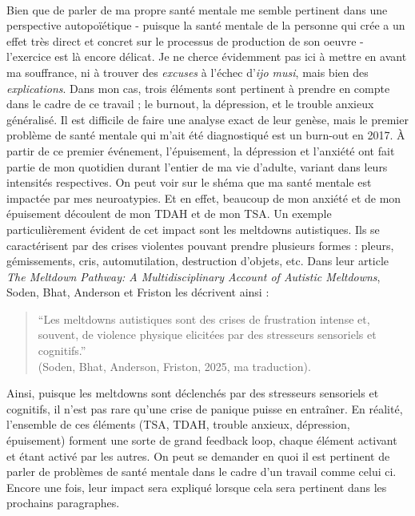 \documentclass{scrartcl}
\let\emph\relax %
\begin{document}
	\emph{Santé mentale}\\
	Bien que de parler de ma propre santé mentale me semble pertinent dans une perspective autopoïétique - puisque la santé mentale de la personne qui crée a un effet très direct et concret sur le processus de production de son oeuvre - l'exercice est là encore délicat. Je ne cherce évidemment pas ici à mettre en avant ma souffrance, ni à trouver des \textit{excuses} à l'échec d'\textit{ijo musi}, mais bien des \textit{explications}. Dans mon cas, trois éléments sont pertinent à prendre en compte dans le cadre de ce travail ; le burnout, la dépression, et le trouble anxieux généralisé. Il est difficile de faire une analyse exact de leur genèse, mais le premier problème de santé mentale qui m'ait été diagnostiqué est un burn-out en 2017. À partir de ce premier événement, l'épuisement, la dépression et l'anxiété ont fait partie de mon quotidien durant l'entier de ma vie d'adulte, variant dans leurs intensités respectives. On peut voir sur le shéma que ma santé mentale est impactée par mes neuroatypies. Et en effet, beaucoup de mon anxiété et de mon épuisement découlent de mon TDAH et de mon TSA. Un exemple particulièrement évident de cet impact sont les meltdowns autistiques. Ils se caractérisent par des crises violentes pouvant prendre plusieurs formes : pleurs, gémissements, cris, automutilation, destruction d'objets, etc. Dans leur article \textit{The Meltdown Pathway: A Multidisciplinary Account of Autistic Meltdowns}, Soden, Bhat, Anderson et Friston les décrivent ainsi :
	\begin{quote}
		“Les meltdowns autistiques sont des crises de frustration intense et, souvent, de violence physique elicitées par des stresseurs sensoriels et cognitifs.”\\ (Soden, Bhat, Anderson, Friston, 2025, ma traduction).
	\end{quote}
	Ainsi, puisque les meltdowns sont déclenchés par des stresseurs sensoriels et cognitifs, il n'est pas rare qu'une crise de panique puisse en entraîner. En réalité, l'ensemble de ces éléments (TSA, TDAH, trouble anxieux, dépression, épuisement) forment une sorte de grand feedback loop, chaque élément activant et étant activé par les autres. On peut se demander en quoi il est pertinent de parler de problèmes de santé mentale dans le cadre d'un travail comme celui ci. Encore une fois, leur impact sera expliqué lorsque cela sera pertinent dans les prochains paragraphes.\\
	
\end{document}
